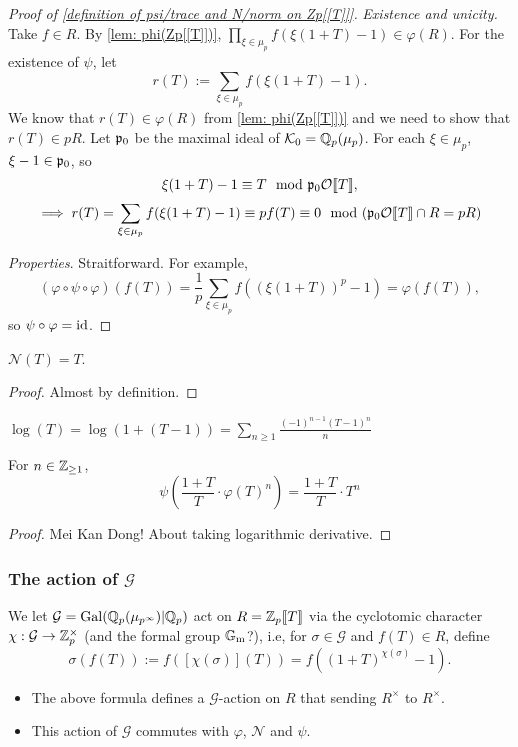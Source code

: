 \begin{proof}[Proof of \cref{definition of psi/trace and N/norm on Zp[[T]]}]
    \textit{Existence and unicity.}
    Take $f\in R$.
    By \cref{lem: phi(Zp[[T]])},
    $\prod_{\xi\in\mu_p}f(\xi(1 + T) - 1)\in \varphi(R)$.
    For the existence of $\psi$,
    let \[r(T) := \sum_{\xi\in\mu_p}f(\xi(1 + T) - 1).\]
    We know that $r(T)\in \varphi(R)$ from \cref{lem: phi(Zp[[T]])} and we need to show that $r(T)\in pR$.
    Let $\mathfrak{p}_0$ be the maximal ideal of $\mathcal{K}_0 = \mathbb{Q}_p(\mu_p)$.
    For each $\xi\in\mu_p$, $\xi - 1\in \mathfrak{p}_0$,
    so
    \[\xi(1 + T) - 1\equiv T\mod {\mathfrak{p}}_0\mathcal{O}\llbracket T  \rrbracket,\]
    \[\implies r(T) = \sum_{\xi\in\mu_p}f(\xi(1  +T) - 1) \equiv pf(T)\equiv 0\mod(\mathfrak{p}_0\mathcal{O}\llbracket T  \rrbracket \cap R = pR)\]


    \textit{Properties}.
    Straitforward.
    For example,
    \[(\varphi\circ \psi\circ\varphi)(f(T)) = \frac{1}{p}\sum_{\xi\in\mu_p} f((\xi(1 + T))^p - 1) = \varphi(f(T)),\]
    so $\psi\circ\varphi = \operatorname{id}$.
\end{proof}

\begin{lemma}
    $\mathcal{N}(T) = T$.
\end{lemma}
\begin{proof}
    Almost by definition.
\end{proof}
$\log(T) = \log(1 + (T - 1)) = \sum_{n\ge 1}\frac{(-1)^{n-1}(T-1)^n}{n}$

\begin{lemma}
    For $n\in\mathbb{Z}_{\ge 1}$,
    \[\psi\left(\frac{1 + T }{T } \cdot\varphi(T)^n \right) = \frac{1 + T}{T}\cdot T^n\]
\end{lemma}
\begin{proof}
    Mei Kan Dong! About taking logarithmic derivative.
\end{proof}

\subsubsection{The action of \texorpdfstring{$\mathcal{G}$}{G}}
We let $\mathcal{G} = \operatorname{Gal}(\mathbb{Q}_p(\mu_{p^\infty})|\mathbb{Q}_p)$ act on $R = \mathbb{Z}_p\llbracket T \rrbracket$
via the cyclotomic character $\chi : \mathcal{G}\to\mathbb{Z}_p^\times$ (and the formal group ${\mathbb{G}_{\mathrm{m}}}$?), i.e,
for $\sigma\in\mathcal{G}$ and $f(T)\in R$, define
\[\sigma(f(T)) := f([\chi(\sigma)](T)) = f((1 + T)^{\chi(\sigma)} - 1).\]
\begin{itemize}
    \item The above formula defines a $\mathcal{G}$-action on $R$ that sending $R^\times$ to $R^\times$.
    \item This action of $\mathcal{G}$ commutes with $\varphi$, $\mathcal{N}$ and $\psi$.
\end{itemize}

